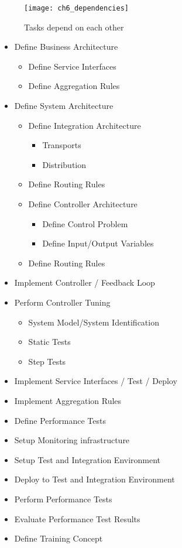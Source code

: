 \begin{figure}[htpb] \centering 
	\texttt{[image: ch6\_dependencies]} 
	\caption{Tasks depend on each other} 
	\label{fig:ch6_dependencies} 
\end{figure}

\begin{itemize}
	\item Define Business Architecture
	\begin{itemize}
		\item Define Service Interfaces
		\item Define Aggregation Rules
	\end{itemize}
	\item Define System Architecture 
	\begin{itemize}
		\item Define Integration Architecture
		\begin{itemize}
			\item Transports
			\item Distribution
		\end{itemize}
		\item Define Routing Rules
		\item Define Controller Architecture 
		\begin{itemize}
			\item Define Control Problem 
			\item Define Input/Output Variables 
		\end{itemize}
		\item Define Routing Rules
	\end{itemize}
	\item Implement Controller / Feedback Loop
	\item Perform Controller Tuning 
	\begin{itemize}
		\item System Model/System Identification 
		\item Static Tests
		\item Step Tests
	\end{itemize}
	\item Implement Service Interfaces / Test / Deploy
	\item Implement Aggregation Rules 
	\item Define Performance Tests 
	\item Setup Monitoring infrastructure
	\item Setup Test and Integration Environment
	\item Deploy to Test and Integration Environment
	\item Perform Performance Tests
	\item Evaluate Performance Test Results
	\item Define Training Concept
\end{itemize}

